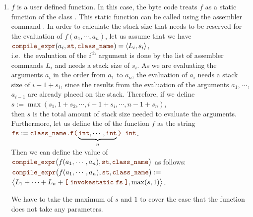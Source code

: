 \begin{enumerate}
      
\item $f$ is a user defined function.  In this case, the byte code treats $f$ as a static function of the
      class .  This static function can be called using the assembler command
      .  In order to calculate the stack size that needs to be reserved for the evaluation
      of  $f(a_1, \cdots, a_n)$, let us assume that we have
      \\[0.2cm]
      \hspace*{1.3cm}
      $\mytt{compile\_expr}(a_i, \mytt{st}, \mytt{class\_name}) = \pair(L_i, s_i)$,
      \\[0.2cm]
      i.e.~the evaluation of the $i^\mathrm{th}$ argument is done by the list of assembler commands $L_i$ and
      needs a stack size of $s_i$.  As we are evaluating the arguments $a_i$ in the order from $a_1$ to $a_n$,
      the evaluation of $a_i$ needs a stack size of $i-1 + s_i$, since the results from the evaluation of
      the arguments $a_1$, $\cdots$, $a_{i-1}$ are already placed on the stack.  Therefore, if we define
      \\[0.2cm]
      \hspace*{1.3cm}
      $s := \max(s_1, 1 + s_2, \cdots, i - 1 + s_i, \cdots, n-1 + s_n)$,
      \\[0.2cm]
      then $s$ is the total amount of stack size needed to evaluate the arguments.  Furthermore, let us define
      the   of the function $f$ as the string
      \\[0.2cm]
      \hspace*{1.3cm}
      $\mytt{fs} := \mytt{class\_name.}\mytt{f(}\underbrace{\mytt{int},\cdots,\mytt{int}}_{n}\mytt{) int}$.
      \\[0.2cm]
      Then we can define the
      value of
      $\mytt{compile\_expr}\bigl(f(a_1,\cdots,a_n), \mytt{st}, \mytt{class\_name}\bigr)$ as follows:
      \\[0.2cm]
      \hspace*{0.8cm}
      $\mytt{compile\_expr}\bigl(f(a_1,\cdots,a_n), \mytt{st}, \mytt{class\_name}\bigr) := $ \\
      \hspace*{3.3cm}
      $\bigl\langle L_1 + \cdots + L_n + \mytt{[} \; \mytt{invokestatic}\; \mytt{fs} \;\mytt{]},
      \max(s,1)\bigr\rangle$.

      We have to take the maximum of $s$ and $1$ to cover the case that the function does not take any
      parameters.
      

\end{enumerate}
